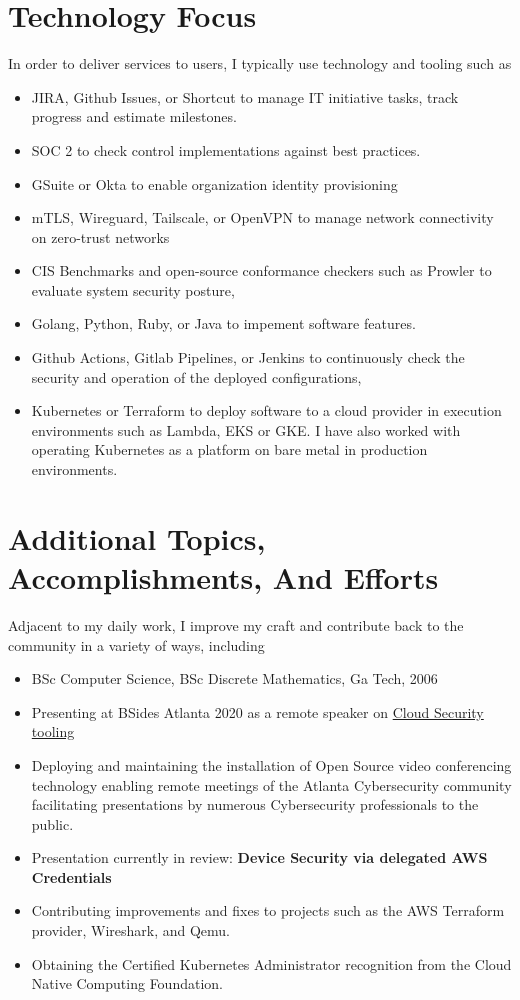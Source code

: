 \documentclass[letterpaper,10pt]{article}
\begin{document}
\section{Technology Focus}
In order to deliver services to users, I typically use technology and tooling such as
\begin{itemize}
	\setlength\itemsep{0.1em}
	\item JIRA, Github Issues, or Shortcut to manage IT initiative tasks, track progress and estimate milestones.
	\item SOC 2 to check control implementations against best practices.
	\item GSuite or Okta to enable organization identity provisioning
	\item mTLS, Wireguard, Tailscale, or OpenVPN to manage network connectivity on zero-trust networks
	\item CIS Benchmarks and open-source conformance checkers such as Prowler to evaluate system security posture,
	\item Golang,  Python,  Ruby, or Java to impement software features.
	\item Github Actions, Gitlab Pipelines, or Jenkins to continuously check the security and operation of the deployed configurations,
	\item Kubernetes or Terraform to deploy software to a cloud provider in execution environments such as Lambda, EKS or GKE. I have also worked with operating Kubernetes as a platform on bare metal in production environments.
\end{itemize}

\section{Additional Topics, Accomplishments, And Efforts}
Adjacent to my daily work, I improve my craft and contribute back to the community in a variety of ways, including
\begin{itemize}
	\setlength\itemsep{0.1em}
	\item BSc Computer Science, BSc Discrete Mathematics, Ga Tech, 2006
	\item Presenting at BSides Atlanta 2020 as a remote speaker on \href{https://www.youtube.com/watch?v=kLCaAaUd1mM}{\color{blue}Cloud Security tooling}
	\item Deploying and maintaining the installation of Open Source video conferencing technology enabling remote meetings of the Atlanta Cybersecurity community facilitating presentations by numerous Cybersecurity professionals to the public.
	\item Presentation currently in review: \textbf{Device Security via delegated AWS Credentials}
	\item Contributing improvements and fixes to projects such as the AWS Terraform provider, Wireshark, and Qemu.
	\item Obtaining the Certified Kubernetes Administrator recognition from the Cloud Native Computing Foundation.
\end{itemize}
\end{document}
